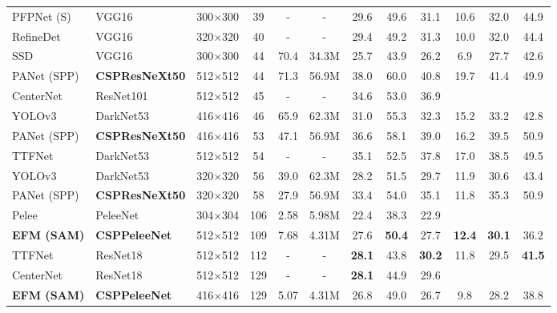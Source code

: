 \documentclass{article}
\begin{document}
\begin{table*}[t]
\begin{threeparttable}[t]
\begin{tabular}{llcccccccccc}
			PFPNet (S) \cite{kim2018parallel} & VGG16 \cite{simonyan2014very} & 300$\times$300 & 39 & - & - & 29.6 & 49.6 & 31.1 & 10.6 & 32.0 & 44.9 \\	
			RefineDet \cite{zhang2018single} & VGG16 \cite{simonyan2014very} & 320$\times$320 & 40 & - & - & 29.4 & 49.2 & 31.3 & 10.0 & 32.0 & 44.4 \\	
			SSD \cite{liu2016ssd} & VGG16 \cite{simonyan2014very} & 300$\times$300 & 44 & 70.4 & 34.3M & 25.7 & 43.9 & 26.2 & 6.9 & 27.7 & 42.6 \\	
			PANet (SPP) \cite{liu2018path} & \textbf{CSPResNeXt50} & 512$\times$512 & 44 & 71.3 & 56.9M & 38.0 & 60.0 & 40.8 & 19.7 & 41.4 & 49.9 \\
			CenterNet \cite{zhou2019objects} & ResNet101 \cite{he2016deep} & 512$\times$512 & 45 & - & - & 34.6 & 53.0 & 36.9 &  &  &  \\	
			YOLOv3 \cite{redmon2018yolov3} & DarkNet53 \cite{redmon2018yolov3} & 416$\times$416 & 46 & 65.9 & 62.3M & 31.0 & 55.3 & 32.3 & 15.2 & 33.2 & 42.8 \\	
			PANet (SPP) \cite{liu2018path} & \textbf{CSPResNeXt50} & 416$\times$416 & 53 & 47.1 & 56.9M & 36.6 & 58.1 & 39.0 & 16.2 & 39.5 & 50.9 \\
			TTFNet \cite{liu2019training} & DarkNet53 \cite{redmon2018yolov3} & 512$\times$512 & 54 & - & - & 35.1 & 52.5 & 37.8 & 17.0 & 38.5 & 49.5 \\	
			YOLOv3 \cite{redmon2018yolov3} & DarkNet53 \cite{redmon2018yolov3} & 320$\times$320 & 56 & 39.0 & 62.3M & 28.2 & 51.5 & 29.7 & 11.9 & 30.6 & 43.4 \\	
			PANet (SPP) \cite{liu2018path} & \textbf{CSPResNeXt50} & 320$\times$320 & 58 & 27.9 & 56.9M & 33.4 & 54.0 & 35.1 & 11.8 & 35.3 & 50.9 \\				
			\midrule
			Pelee \cite{wang2018pelee} & PeleeNet \cite{wang2018pelee} & 304$\times$304 & 106 & 2.58 & 5.98M & 22.4 & 38.3 & 22.9 &  &  &  \\
			\textbf{EFM (SAM)} & \textbf{CSPPeleeNet} & 512$\times$512 & 109 & 7.68 & 4.31M & 27.6 & \textbf{50.4} & 27.7 & \textbf{12.4} & \textbf{30.1} & 36.2 \\
			TTFNet \cite{liu2019training} & ResNet18 \cite{he2016deep} & 512$\times$512 & 112 & - & - & \textbf{28.1} & 43.8 & \textbf{30.2} & 11.8 & 29.5 & \textbf{41.5} \\
			CenterNet \cite{zhou2019objects} & ResNet18 \cite{he2016deep} & 512$\times$512 & 129 & - & - & \textbf{28.1} & 44.9 & 29.6 &  &  &  \\
			\textbf{EFM (SAM)} & \textbf{CSPPeleeNet} & 416$\times$416 & 129 & 5.07 & 4.31M & 26.8 & 49.0 & 26.7 & 9.8 & 28.2 & 38.8 \\

\end{tabular}
\end{threeparttable}
\end{table*}
\end{document}
